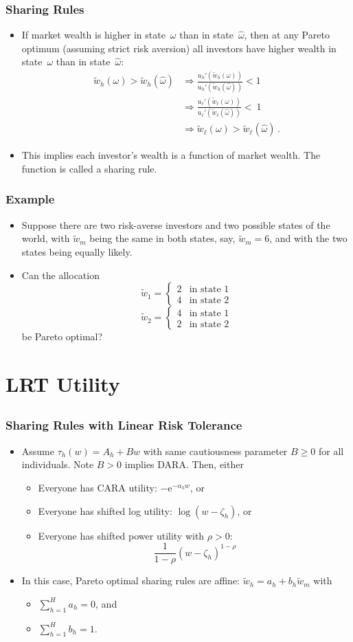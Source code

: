\documentclass[10pt]{beamer}
\newcommand{\bi}{\begin{itemize}}
\newcommand{\ei}{\end{itemize}}
\newcommand{\im}{\item}
\newcommand{\E}{\mathrm{e}}
\newcommand{\bfr}{\begin{frame}}
\newcommand{\tw}{\tilde{w}}
\begin{document}
  \bfr\frametitle{Sharing Rules}
  \bi 
     \im If market wealth is higher in state~$\omega$ than in state~$\hat\omega$, then at any Pareto optimum (assuming strict risk aversion) all investors have higher wealth in state~$\omega$ than in state~$\hat\omega$: 
  \begin{align*}
  \widetilde{w}_h(\omega)>\widetilde{w}_h(\hat\omega) & \Rightarrow \frac{u_h'(\widetilde{w}_h(\omega))}{u_h'(\widetilde{w}_h(\hat\omega))} < 1 \\
  & \Rightarrow \frac{u_\ell'(\widetilde{w}_\ell(\omega))}{u_\ell'(\widetilde{w}_\ell(\hat\omega))} <~1 \\
  &\Rightarrow \widetilde{w}_\ell(\omega)>\widetilde{w}_\ell(\hat\omega)\,.
  \end{align*}
   \im This implies each investor's wealth is a function of market wealth.  The function is called a sharing rule.
  \ei 
  \end{frame}
  
  \bfr\frametitle{Example}
  \bi 
  \im 
  Suppose there are two risk-averse investors and two possible states of the world, with  $\widetilde{w}_m$ being the same in both states, say, $\widetilde{w}_m=6$, and with the two states being equally likely.  
  \im Can the allocation
  $$\widetilde{w}_1 = \begin{cases} 2 & \text{in state~1}\\
  4 & \text{in state~2}
  \end{cases}$$
  $$\widetilde{w}_2 = \begin{cases} 4 & \text{in state~1}\\
  2 & \text{in state~2}
  \end{cases}$$
  be Pareto optimal?
  \ei
  \end{frame}
  
  \section{LRT Utility}\subsection{}
  
  \bfr\frametitle{Sharing Rules with Linear Risk Tolerance}
  \bi 
  \im Assume $\tau_h(w) = A_h + B w$ with same cautiousness parameter $B\ge 0$ for all individuals.  Note $B>0$ implies DARA.  Then, either
  \bi
  \im Everyone has CARA utility: $-\E^{-\alpha_h w}$, or
  \im Everyone has shifted log utility:  $\log (w- \zeta_h)$, or
  \im Everyone has shifted power utility with $\rho>0$: 
  $$\frac{1}{1-\rho} (w-\zeta_h)^{1-\rho}$$
  \ei
  \im 
  In this case, Pareto optimal sharing rules are affine: $\tw_h = a_h + b_h \tw_m$ with
  \bi
  \im $\sum_{h=1}^H a_h = 0$, and
  \im $\sum_{h=1}^H b_h = 1$.
  \ei
  \ei 
  \end{frame}
  
\end{document}
